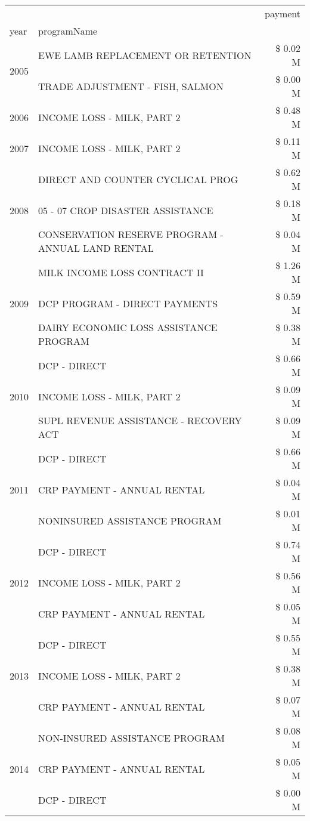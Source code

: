 \begin{tabular}{llr}
\toprule
 &  & payment \\
year & programName &  \\
\midrule
\multirow[t]{2}{*}{2005} & EWE LAMB REPLACEMENT OR RETENTION & \$ 0.02 M \\
 & TRADE ADJUSTMENT - FISH, SALMON & \$ 0.00 M \\
\cline{1-3}
2006 & INCOME LOSS - MILK, PART 2 & \$ 0.48 M \\
\cline{1-3}
2007 & INCOME LOSS - MILK, PART 2 & \$ 0.11 M \\
\cline{1-3}
\multirow[t]{3}{*}{2008} & DIRECT AND COUNTER CYCLICAL PROG & \$ 0.62 M \\
 & 05 - 07 CROP DISASTER ASSISTANCE & \$ 0.18 M \\
 & CONSERVATION RESERVE PROGRAM - ANNUAL LAND RENTAL & \$ 0.04 M \\
\cline{1-3}
\multirow[t]{3}{*}{2009} & MILK INCOME LOSS CONTRACT II & \$ 1.26 M \\
 & DCP PROGRAM - DIRECT PAYMENTS & \$ 0.59 M \\
 & DAIRY ECONOMIC LOSS ASSISTANCE PROGRAM & \$ 0.38 M \\
\cline{1-3}
\multirow[t]{3}{*}{2010} & DCP - DIRECT & \$ 0.66 M \\
 & INCOME LOSS - MILK, PART 2 & \$ 0.09 M \\
 & SUPL REVENUE ASSISTANCE - RECOVERY ACT & \$ 0.09 M \\
\cline{1-3}
\multirow[t]{3}{*}{2011} & DCP - DIRECT & \$ 0.66 M \\
 & CRP PAYMENT - ANNUAL RENTAL & \$ 0.04 M \\
 & NONINSURED ASSISTANCE PROGRAM & \$ 0.01 M \\
\cline{1-3}
\multirow[t]{3}{*}{2012} & DCP - DIRECT & \$ 0.74 M \\
 & INCOME LOSS - MILK, PART 2 & \$ 0.56 M \\
 & CRP PAYMENT - ANNUAL RENTAL & \$ 0.05 M \\
\cline{1-3}
\multirow[t]{3}{*}{2013} & DCP - DIRECT & \$ 0.55 M \\
 & INCOME LOSS - MILK, PART 2 & \$ 0.38 M \\
 & CRP PAYMENT - ANNUAL RENTAL & \$ 0.07 M \\
\cline{1-3}
\multirow[t]{3}{*}{2014} & NON-INSURED ASSISTANCE PROGRAM & \$ 0.08 M \\
 & CRP PAYMENT - ANNUAL RENTAL & \$ 0.05 M \\
 & DCP - DIRECT & \$ 0.00 M \\

\end{tabular}

